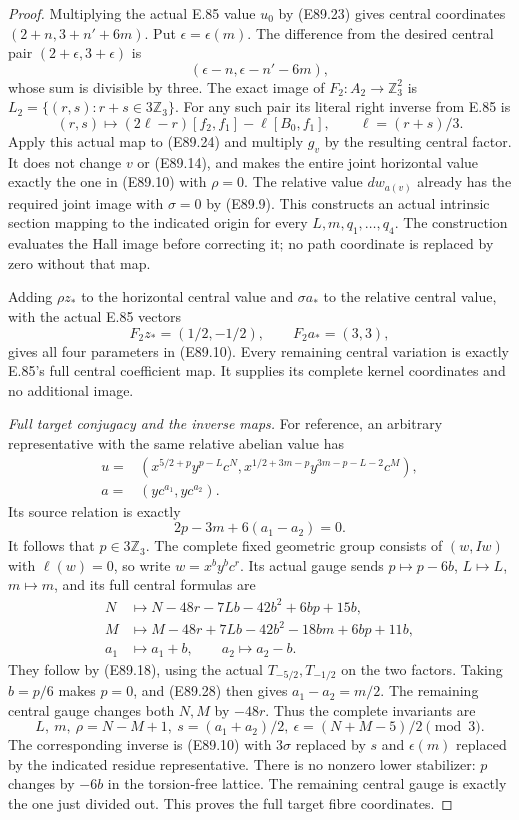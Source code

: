 \begin{proof}
Multiplying the actual E.85 value $u_0$
by (E89.23) gives central coordinates
$(2+n,3+n'+6m)$. Put $\epsilon=\epsilon(m)$.
The difference from the desired central
pair $(2+\epsilon,3+\epsilon)$ is
\[
             (\epsilon-n,\epsilon-n'-6m),
 \tag{E89.24}
\]
whose sum is divisible by three. The exact
image of $F_2:A_2\to\mathbb Z_3^2$ is
$L_2=\{(r,s):r+s\in3\mathbb Z_3\}$.
For any such pair its literal right inverse
from E.85 is
\[
 (r,s)\longmapsto
     (2\ell-r)[f_2,f_1]-\ell[B_0,f_1],
                      \qquad\ell=(r+s)/3.
 \tag{E89.25}
\]
Apply this actual map to (E89.24) and multiply
$g_v$ by the resulting central factor. It
does not change $v$ or (E89.14), and makes
the entire joint horizontal value exactly
the one in (E89.10) with $\rho=0$.
The relative value $d w_{a(v)}$ already has
the required joint image with $\sigma=0$
by (E89.9). This constructs an actual
intrinsic section mapping to the indicated
origin for every $L,m,q_1,\ldots,q_4$.
The construction evaluates the Hall image
before correcting it; no path coordinate
is replaced by zero without that map.

Adding $\rho z_*$ to the horizontal central
value and $\sigma a_*$ to the relative central
value, with the actual E.85 vectors
\[
 F_2z_*=(1/2,-1/2),\qquad F_2a_*=(3,3),
 \tag{E89.26}
\]
gives all four parameters in (E89.10).
Every remaining central variation is
exactly E.85's full central coefficient
map. It supplies its complete kernel
coordinates and no additional image.

\emph{Full target conjugacy and the inverse maps.}
For reference, an arbitrary representative
with the same relative abelian value has
\[
 \begin{aligned}
 u={}&(x^{5/2+p}y^{p-L}c^N,
       x^{1/2+3m-p}y^{3m-p-L-2}c^M),\\
 a={}&(yc^{a_1},yc^{a_2}).
 \end{aligned}
 \tag{E89.27}
\]
Its source relation is exactly
\[
                   2p-3m+6(a_1-a_2)=0.
 \tag{E89.28}
\]
It follows that $p\in3\mathbb Z_3$.
The complete fixed geometric group consists
of $(w,Iw)$ with $\ell(w)=0$, so write
$w=x^b y^b c^r$. Its actual gauge sends
$p\mapsto p-6b$, $L\mapsto L$, $m\mapsto m$,
and its full central formulas are
\[
 \begin{aligned}
 N&\longmapsto N-48r-7Lb-42b^2+6bp+15b,\\
 M&\longmapsto M-48r+7Lb-42b^2-18bm+6bp+11b,\\
 a_1&\longmapsto a_1+b,
          \qquad a_2\longmapsto a_2-b.
 \end{aligned}
 \tag{E89.29}
\]
They follow by (E89.18), using the actual
$T_{-5/2},T_{-1/2}$ on the two factors.
Taking $b=p/6$ makes $p=0$, and (E89.28)
then gives $a_1-a_2=m/2$. The remaining
central gauge changes both $N,M$ by $-48r$.
Thus the complete invariants are
\[
 L,\ m,\ \rho=N-M+1,\
 s=(a_1+a_2)/2,\
 \epsilon=(N+M-5)/2\pmod3.
 \tag{E89.30}
\]
The corresponding inverse is (E89.10)
with $3\sigma$ replaced by $s$ and
$\epsilon(m)$ replaced by the indicated
residue representative. There is no
nonzero lower stabilizer: $p$ changes by
$-6b$ in the torsion-free lattice. The
remaining central gauge is exactly the
one just divided out. This proves the
full target fibre coordinates.


\end{proof}
